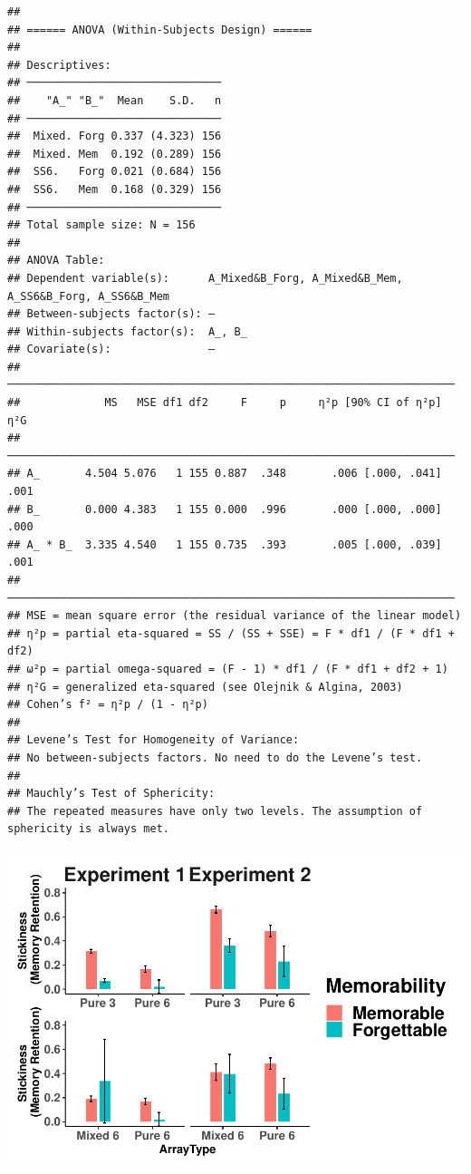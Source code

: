 \documentclass[
  man]{apa6}
\begin{document}
\begin{verbatim}
## 
## ====== ANOVA (Within-Subjects Design) ======
## 
## Descriptives:
## ──────────────────────────────
##    "A_" "B_"  Mean    S.D.   n
## ──────────────────────────────
##  Mixed. Forg 0.337 (4.323) 156
##  Mixed. Mem  0.192 (0.289) 156
##  SS6.   Forg 0.021 (0.684) 156
##  SS6.   Mem  0.168 (0.329) 156
## ──────────────────────────────
## Total sample size: N = 156
## 
## ANOVA Table:
## Dependent variable(s):      A_Mixed&B_Forg, A_Mixed&B_Mem, A_SS6&B_Forg, A_SS6&B_Mem
## Between-subjects factor(s): –
## Within-subjects factor(s):  A_, B_
## Covariate(s):               –
## ─────────────────────────────────────────────────────────────────────
##             MS   MSE df1 df2     F     p     η²p [90% CI of η²p]  η²G
## ─────────────────────────────────────────────────────────────────────
## A_       4.504 5.076   1 155 0.887  .348       .006 [.000, .041] .001
## B_       0.000 4.383   1 155 0.000  .996       .000 [.000, .000] .000
## A_ * B_  3.335 4.540   1 155 0.735  .393       .005 [.000, .039] .001
## ─────────────────────────────────────────────────────────────────────
## MSE = mean square error (the residual variance of the linear model)
## η²p = partial eta-squared = SS / (SS + SSE) = F * df1 / (F * df1 + df2)
## ω²p = partial omega-squared = (F - 1) * df1 / (F * df1 + df2 + 1)
## η²G = generalized eta-squared (see Olejnik & Algina, 2003)
## Cohen’s f² = η²p / (1 - η²p)
## 
## Levene’s Test for Homogeneity of Variance:
## No between-subjects factors. No need to do the Levene’s test.
## 
## Mauchly’s Test of Sphericity:
## The repeated measures have only two levels. The assumption of sphericity is always met.
\end{verbatim}

\includegraphics{Script_Re_Greer_2023_group1Rock_2023_files/figure-latex/paste top and bottom-1.pdf}
\end{document}
